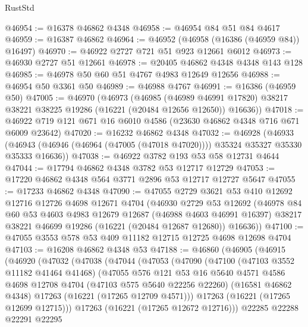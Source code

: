 \begin{lexlean}{RustStd}
\begin{coremodule}
@46954 := @16378 @46862 @4348
@46958 := @46954 @84 @51 @84 @4617
@46959 := @16387 @46862
@46964 := @46952 (@46958 (@16386 (@46959 @84)) @16497)
@46970 := @46922 @2727 @721 @51 @923 @12661 @6012
@46973 := @46930 @2727 @51 @12661
@46978 := @20405 @46862 @4348 @4348 @143 @128
@46985 := @46978 @50 @60 @51 @4767 @4983 @12649 @12656
@46988 := @46954 @50 @3361 @50
@46989 := @46988 @4767
@46991 := @16386 (@46959 @50)
@47005 := @46970
    (@46973
      (@46985
        (@46989 @46991 @17820)
        @38217
        @38221
        @38225
        @19286
        (@16221 (@20484 @12656 @12650))
        @16636))
@47018 := @46922 @719 @121 @671 @16 @6010 @4586 (@23630 @46862 @4348 @716 @671 @6009 @23642)
@47020 := @16232 @46862 @4348
@47032 := @46928
    (@46933 (@46943 (@46946 (@46964 (@47005 (@47018 @47020)))) @35324 @35327 @35330 @35333 @16636))
@47038 := @46922 @3782 @193 @53 @58 @12731 @4644
@47044 := @17794 @46862 @4348 @3782 @53 @12717 @12729
@47053 := @17220 @46862 @4348 @564 @3771 @2896 @53 @12717 @12727 @5647
@47055 := @17233 @46862 @4348
@47090 := @47055
    @2729
    @3621
    @53
    @410
    @12692
    @12716
    @12726
    @4698
    @12671
    @4704
    (@46930
      @2729
      @53
      @12692
      (@46978
        @84
        @60
        @53
        @4603
        @4983
        @12679
        @12687
        (@46988 @4603 @46991 @16397)
        @38217
        @38221
        @46699
        @19286
        (@16221 (@20484 @12687 @12680))
        @16636))
@47100 := @47055 @3553 @578 @53 @409 @11182 @12715 @12725 @4698 @12698 @4704
@47103 := @16208 @46862 @4348 @53
@47188 := @46860
    (@46905
      (@46915
        (@46920
          (@47032
            (@47038
              (@47044
                (@47053
                  (@47090
                    (@47100
                      (@47103 @3552 @11182 @41464 @41468)
                      (@47055
                        @576
                        @121
                        @53
                        @16
                        @5640
                        @4571
                        @4586
                        @4698
                        @12708
                        @4704
                        (@47103 @575 @5640 @22256 @22260)
                        (@16581 @46862 @4348)
                        @17263
                        (@16221 (@17265 @12709 @4571)))
                      @17263
                      (@16221 (@17265 @12699 @12715)))
                    @17263
                    (@16221 (@17265 @12672 @12716)))
                  @22285
                  @22288
                  @22291
                  @22295

\end{coremodule}
\end{lexlean}
